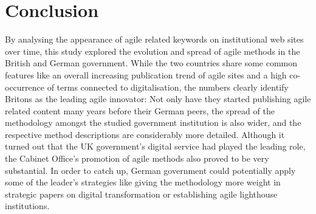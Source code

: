 \section{Conclusion}\label{Conclusion}
By analysing the appearance of agile related keywords on institutional web sites over time, this study explored the evolution and spread of agile methods in the British and German government. While the two countries share some common features like an overall increasing publication trend of agile sites and a high co-occurrence of terms connected to digitalisation, the numbers clearly identify Britons as the leading agile innovator: Not only have they started publishing agile related content many years before their German peers, the spread of the methodology amongst the studied government institution is also wider, and the respective method descriptions are considerably more detailed. Although it turned out that the UK government's digital service had played the leading role, the Cabinet Office's promotion of agile methods also proved to be very substantial. In order to catch up, German government could potentially apply some of the leader's strategies like giving the methodology more weight in strategic papers on digital transformation or establishing agile lighthouse institutions.
